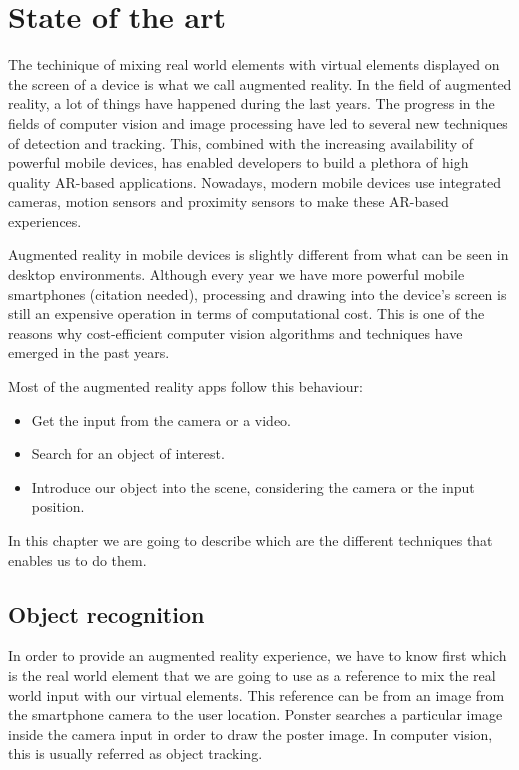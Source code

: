 \chapter{State of the art}
The techinique of
mixing real world elements with virtual elements displayed on the screen of a
device is what we call augmented reality. In the field of augmented reality, a
lot of things have happened during the last years. The progress in the fields
of computer vision and image processing have led to several new techniques of
detection and tracking. This, combined with the increasing availability of
powerful mobile devices, has enabled developers to build a plethora of high
quality AR-based applications. Nowadays, modern mobile devices use integrated
cameras, motion sensors and proximity sensors to make these AR-based experiences. 

Augmented reality in mobile devices is slightly different from what can be seen in
desktop environments. Although every year we have more powerful mobile smartphones
(citation needed), processing and drawing into the device's screen is still an
expensive operation in terms of computational cost. This is one of the reasons why
cost-efficient computer vision algorithms and techniques have emerged in the past
years. 

Most of the augmented reality apps follow this behaviour:
\begin{itemize}
\item Get the input from the camera or a video.
\item Search for an object of interest.
\item Introduce our object into the scene, considering the camera or the input position.
\end{itemize}

In this chapter we are going to describe which are the different techniques
that enables us to do them. 



\section{Object recognition}
In order to provide an augmented reality experience, we have to know first
which is the real world element that we are going to use as a reference to mix
the real world input with our virtual elements. This reference can be from an
image from the smartphone camera to the user location. Ponster searches a
particular image inside the camera input in order to draw the poster image. In
computer vision, this is usually referred as object tracking. 

